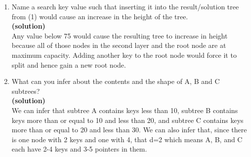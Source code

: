 \documentclass[11pt]{article}
\renewcommand\part[1]{\vspace{.10in}\textbf{(#1)}}
\begin{document}
\begin{enumerate}
	\item Name a search key value such that inserting it into the result/solution tree from (1) would cause an increase in the height of the tree.\\
	\part{solution}\\
	Any value below 75 would cause the resulting tree to increase in height because all of those nodes in the second layer and the root node are at maximum capacity. Adding another key to the root node would force it to split and hence gain a new root node.

	\item What can you infer about the contents and the shape of A, B and C subtrees?\\
	\part{solution}\\
	We can infer that subtree A contains keys less than 10, subtree B contains keys more than or equal to 10 and less than 20, and subtree C contains keys more than or equal to 20 and less than 30. We can also infer that, since there is one node with 2 keys and one with 4, that d=2 which means A, B, and C each have 2-4 keys and 3-5 pointers in them.

\end{enumerate}
\end{document}
